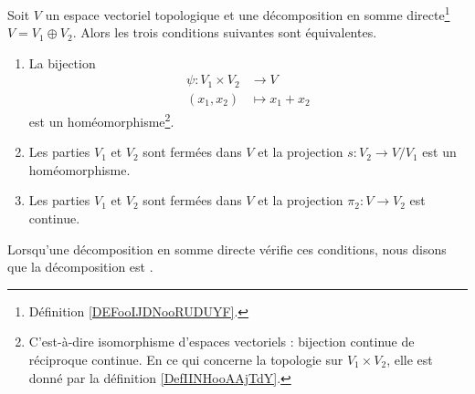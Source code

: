 \begin{propositionDef}     \label{PropKZDqTR}
	Soit \( V\) un espace vectoriel topologique et une décomposition en somme directe\footnote{Définition \ref{DEFooIJDNooRUDUYF}.} \( V=V_1\oplus V_2\). Alors les trois conditions suivantes sont équivalentes.
	\begin{enumerate}
		\item       \label{ITEMooMUELooWdJQeW}
		      La bijection
		      \begin{equation}
			      \begin{aligned}
				      \psi\colon V_1\times V_2 & \to V           \\
				      (x_1,x_2)                & \mapsto x_1+x_2
			      \end{aligned}
		      \end{equation}
		      est un homéomorphisme\footnote{C'est-à-dire isomorphisme d'espaces vectoriels : bijection continue de réciproque continue. En ce qui concerne la topologie sur \( V_1\times V_2\), elle est donné par la définition \ref{DefIINHooAAjTdY}.}.
		\item       \label{ITEMooDKOYooUpEfOR}
		      Les parties \( V_1\) et \( V_2\) sont fermées dans \( V\) et la projection \( s\colon V_2\to V/V_1\) est un homéomorphisme.
		\item       \label{ITEMooFSSMooCQzTIc}
		      Les parties \( V_1\) et \( V_2\) sont fermées dans \( V\) et la projection \( \pi_2\colon V \to V_2 \) est continue.
	\end{enumerate}
	Lorsqu'une décomposition en somme directe vérifie ces conditions, nous disons que la décomposition est .
\end{propositionDef}

